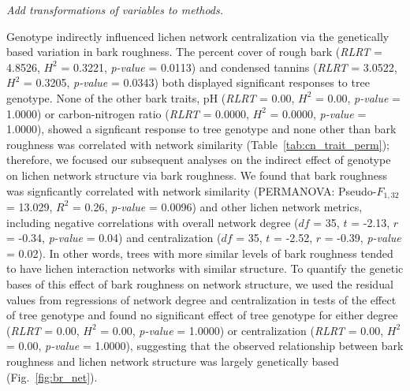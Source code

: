 \documentclass[11pt,twocolumn,twoside,lineno]{pnas-new}
\begin{document}
\textit{Add transformations of variables to methods.}

Genotype indirectly influenced lichen network centralization via the
genetically based variation in bark roughness. The percent cover of
rough bark (\textit{RLRT} = 4.8526, $H^2$ = 0.3221, \textit{p-value} =
0.0113) and condensed tannins (\textit{RLRT} = 3.0522, $H^2$ = 0.3205,
\textit{p-value} = 0.0343) both displayed significant responses to
tree genotype. None of the other bark traits, pH (\textit{RLRT} =
0.00, $H^2$ = 0.00, \textit{p-value} = 1.0000) or carbon-nitrogen
ratio (\textit{RLRT} = 0.0000, $H^2$ = 0.0000, \textit{p-value} =
1.0000), showed a signficant response to tree genotype and none other
than bark roughness was correlated with network similarity
(Table~\ref{tab:cn_trait_perm}); therefore, we focused our subsequent
analyses on the indirect effect of genotype on lichen network
structure via bark roughness. We found that bark roughness was
signficantly correlated with network similarity (PERMANOVA:
Pseudo-$F_{1,32}$ = 13.029, $R^2$ = 0.26, \textit{p-value} = 0.0096)
and other lichen network metrics, including negative correlations with
overall network degree ($df$ = 35, $t$ = -2.13, $r$ = -0.34,
\textit{p-value} = 0.04) and centralization ($df$ = 35, $t$ = -2.52,
$r$ = -0.39, \textit{p-value} = 0.02). In other words, trees with more
similar levels of bark roughness tended to have lichen interaction
networks with similar structure. To quantify the genetic bases of this
effect of bark roughness on network structure, we used the residual
values from regressions of network degree and centralization in tests
of the effect of tree genotype and found no significant effect of tree
genotype for either degree (\textit{RLRT} = 0.00, $H^2$ = 0.00,
\textit{p-value} = 1.0000) or centralization (\textit{RLRT} = 0.00,
$H^2$ = 0.00, \textit{p-value} = 1.0000), suggesting that the observed
relationship between bark roughness and lichen network structure was
largely genetically based (Fig.~\ref{fig:br_net}).


\end{document}
